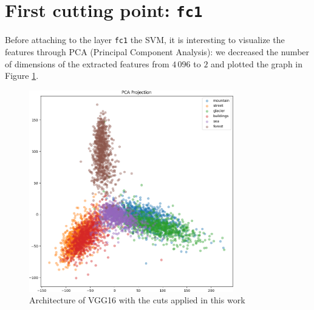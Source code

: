 \documentclass[compsoc]{IEEEtran}
\begin{document}
\begin{table}[]
\centering
{}
\caption{Number of VGG16's trainable parameters and dimensions of the extracted features at each cutting point}
\label{tab:dims}
\end{table}

\section{First cutting point: \texttt{fc1}}
Before attaching to the layer \texttt{fc1} the SVM, it is interesting to visualize the features through PCA (Principal Component Analysis): we decreased the number of dimensions of the extracted features from $4\,096$ to $2$ and plotted the graph in Figure \ref{fig:pca1}.

\begin{figure}[ht!]
\centering                                                                        
\includegraphics[width=3.5in]{../images/pca-1.png}
\captionsetup{justification=centering}                                                                                         
\caption{Architecture of VGG16 with the cuts applied in this work}
\label{fig:pca1}                                                                                                                               
\end{figure}
\end{document}
